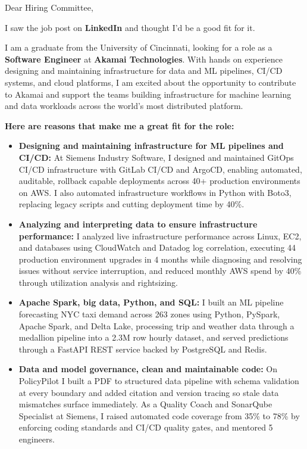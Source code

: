 \documentclass[11pt]{letter}
\date{}
\begin{document}
\begin{letter}{}

\opening{Dear Hiring Committee,}

I saw the job post on \textbf{LinkedIn} and thought I'd be a good fit for it.

I am a graduate from the University of Cincinnati, looking for a role as a \textbf{Software Engineer} at \textbf{Akamai Technologies}. With hands on experience designing and maintaining infrastructure for data and ML pipelines, CI/CD systems, and cloud platforms, I am excited about the opportunity to contribute to Akamai and support the teams building infrastructure for machine learning and data workloads across the world's most distributed platform.

\textbf{Here are reasons that make me a great fit for the role:}

\begin{itemize}[leftmargin=*, itemsep=0.45em]
    \item \textbf{Designing and maintaining infrastructure for ML pipelines and CI/CD:} At Siemens Industry Software, I designed and maintained GitOps CI/CD infrastructure with GitLab CI/CD and ArgoCD, enabling automated, auditable, rollback capable deployments across 40+ production environments on AWS. I also automated infrastructure workflows in Python with Boto3, replacing legacy scripts and cutting deployment time by 40\%.

    \item \textbf{Analyzing and interpreting data to ensure infrastructure performance:} I analyzed live infrastructure performance across Linux, EC2, and databases using CloudWatch and Datadog log correlation, executing 44 production environment upgrades in 4 months while diagnosing and resolving issues without service interruption, and reduced monthly AWS spend by 40\% through utilization analysis and rightsizing.

    \item \textbf{Apache Spark, big data, Python, and SQL:} I built an ML pipeline forecasting NYC taxi demand across 263 zones using Python, PySpark, Apache Spark, and Delta Lake, processing trip and weather data through a medallion pipeline into a 2.3M row hourly dataset, and served predictions through a FastAPI REST service backed by PostgreSQL and Redis.

    \item \textbf{Data and model governance, clean and maintainable code:} On PolicyPilot I built a PDF to structured data pipeline with schema validation at every boundary and added citation and version tracing so stale data mismatches surface immediately. As a Quality Coach and SonarQube Specialist at Siemens, I raised automated code coverage from 35\% to 78\% by enforcing coding standards and CI/CD quality gates, and mentored 5 engineers.
\end{itemize}


\end{letter}
\end{document}
